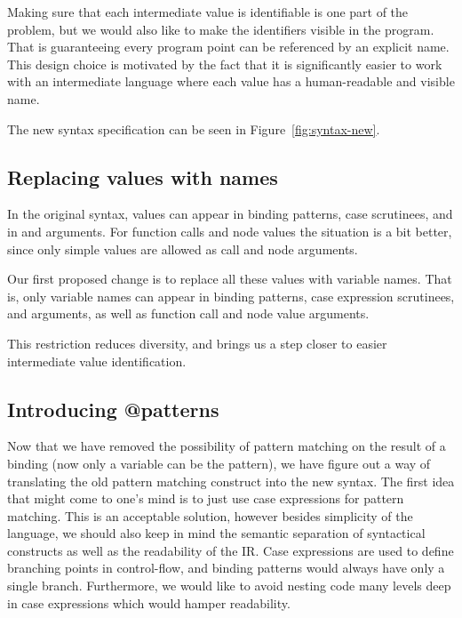 \documentclass[main.tex]{subfiles}
\begin{document}
  Making sure that each intermediate value is identifiable is one part of the problem, but we would also like to make the identifiers visible in the program. That is guaranteeing every program point can be referenced by an explicit name. This design choice is motivated by the fact that it is significantly easier to work with an intermediate language where each value has a human-readable and visible name.
  
  The new syntax specification can be seen in Figure~\ref{fig:syntax-new}.

  \subsection{Replacing values with names}

  In the original syntax, values can appear in binding patterns, case scrutinees, and in  and  arguments. For function calls and node values the situation is a bit better, since only simple values are allowed as call and node arguments.

  Our first proposed change is to replace all these values with variable names. That is, only variable names can appear in binding patterns, case expression scrutinees,  and  arguments, as well as function call and node value arguments.

  This restriction reduces diversity, and brings us a step closer to easier intermediate value identification.

  \subsection{Introducing @patterns}

  Now that we have removed the possibility of pattern matching on the result of a binding (now only a variable can be the pattern), we have figure out a way of translating the old pattern matching construct into the new syntax. The first idea that might come to one's mind is to just use case expressions for pattern matching. This is an acceptable solution, however besides simplicity of the language, we should also keep in mind the semantic separation of syntactical constructs as well as the readability of the IR. Case expressions are used to define branching points in control-flow, and binding patterns would always have only a single branch. Furthermore, we would like to avoid nesting code many levels deep in case expressions which would hamper readability.
\end{document}
